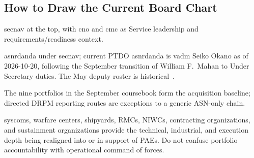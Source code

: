 \documentclass[../main.tex]{subfiles}
\begin{document}
\subsection{How to Draw the Current Board Chart}
\begin{description}[style=nextline, labelsep=0.5em, font=\bfseries]
  \item[Top.] \ac{secnav} at the top, with \ac{cno} and \ac{cmc} as Service leadership and requirements/readiness context.
  \item[Acquisition executive.] \ac{asnrdanda} under \ac{secnav}; current PTDO \ac{asnrdanda} is \ac{vadm} Seiko Okano as of 2026-10-20, following the September transition of William F.\ Mahan to Under Secretary duties. The May deputy roster is historical~\autocite{ExecutiveGov-ASNRDA-Sep2026,DONCIO-Okano-PTDO-2026}.
  \item[Portfolio layer.] The nine portfolios in the September coursebook form the acquisition baseline; directed DRPM reporting routes are exceptions to a generic ASN-only chain.
  \item[Support and authorities.] \acp{syscom}, warfare centers, shipyards, RMCs, NIWCs, contracting organizations, and sustainment organizations provide the technical, industrial, and execution depth being realigned into or in support of PAEs. Do not confuse portfolio accountability with operational command of forces.
\end{description}
\end{document}
